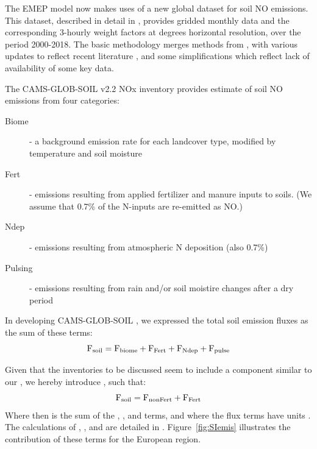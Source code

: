 The EMEP model now makes uses of a new global dataset for soil NO
emissions. This dataset, described in detail in \citet{SimpsonDarras:2021},
provides gridded monthly data and the corresponding 3-hourly
weight factors at  degrees horizontal resolution, over
the period 2000-2018.  The basic methodology merges methods from
\citet{YiengerLevy:1995}, with various updates to reflect recent
literature \citep[especially][]{SteinkampLawrence2011}, and some
simplifications which reflect lack of  availability of some key data.



The CAMS-GLOB-SOIL v2.2 NOx inventory
provides estimate of soil NO emissions from four categories:

\begin{description}
  \item[Biome] - a background emission rate for each landcover type, modified by temperature
and soil moisture %
  \item[Fert] - emissions resulting from applied fertilizer and manure inputs to soils. (We assume
that  0.7\% of the N-inputs are re-emitted as NO.)
  \item[Ndep] - emissions resulting from atmospheric N deposition (also 0.7\%)
  \item[Pulsing] - emissions resulting from rain and/or soil moistire changes after
    a dry period
\end{description}

In developing CAMS-GLOB-SOIL , we  expressed the total soil emission fluxes as the sum
of these terms:
\begin{equation}
  \mbox{F}_{\scriptsize \mbox{soil}} = \mbox{F}_{\scriptsize \mbox{biome}}  + \mbox{F}_{\scriptsize \mbox{Fert}} + \mbox{F}_{\scriptsize \mbox{Ndep}} + \mbox{F}_{\scriptsize \mbox{pulse}}
  \label{eqn:Fs}
\end{equation}

Given that the inventories to be discussed seem to include a
component similar to our \Ff, we hereby introduce \Fn, such that:
\begin{equation}
  \mbox{F}_{\scriptsize \mbox{soil}} = \mbox{F}_{\scriptsize \mbox{nonFert}}  + \mbox{F}_{\scriptsize \mbox{Fert}}
  \label{eqn:Fn}
\end{equation}
Where \Fn then is the sum of the \Fb, \Fd, and \Fp terms, and where the
flux terms have units \ngN. The calculations of \Fb, \Ff, \Fd and \Fp
are detailed in \citet{SimpsonDarras:2021}.
Figure~\ref{fig:SIemis} illustrates the contribution of these terms for
the European region.

